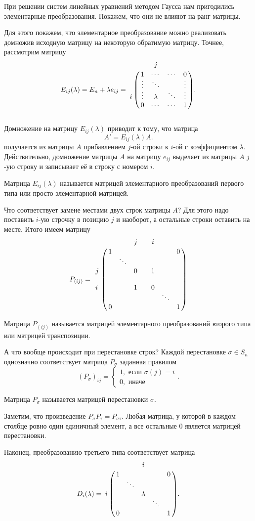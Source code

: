 При решении систем линейных уравнений методом Гаусса нам пригодились элементарные преобразования. Покажем, что они не влияют на ранг матрицы.

Для этого покажем, что элементарное преобразование можно реализовать домножив исходную матрицу на некоторую обратимую матрицу. Точнее, рассмотрим матрицу
$$ E_{ij}(\lambda)=E_n +\lambda e_{ij}=
\bordermatrix{
 & &j&& \cr
 &1&\cdots&\cdots&0\cr
 &\vdots&\ddots && \vdots\cr
i&\vdots& \lambda & \ddots& \vdots\cr
 &0&\cdots& \cdots&1
}.
$$\\
Домножение на матрицу $E_{ij}(\lambda)$ приводит к тому, что матрица
$$A'=E_{ij}(\lambda)A.$$
получается из матрицы $A$ прибавлением $j$-ой строки к $i$-ой с коэффициентом $\lambda$.
Действительно, домножение матрицы $A$ на матрицу $e_{ij}$ выделяет из матрицы $A$ $j$-ую строку и записывает её в строку с номером $i$.

\dfn Матрица $E_{ij}(\lambda)$ называется матрицей элементарного преобразований первого типа или просто элементарной матрицей.
\edfn

Что соответствует замене местами двух строк матрицы $A$? Для этого надо поставить $i$-ую строчку в позицию $j$ и наоборот, а остальные строки оставить на месте. Итого имеем матрицу
$$P_{(ij)}=\,\bordermatrix{
 & & &j& & i& \cr
 &1& & & & & &0\cr
 & &\ddots & & & & \cr
j\,& && 0 & & 1 & &\cr
\,& &&  & &  & &\cr
i\,& && 1 & &0 & &\cr
 & & & & & & \ddots& \cr
 &0& & & & & &1
}
$$


\dfn Матрица $P_{(ij)}$ называется матрицей элементарного преобразований второго типа или матрицей транспозиции.
\edfn

А что вообще происходит при перестановке строк? Каждой перестановке $\sigma \in S_n$ однозначно соответствует матрица $P_{\sigma}$ заданная правилом
$$(P_{\sigma})_{ij}= \begin{cases}
1, \text{ если $\sigma(j)=i$}\\
0, \text{ иначе }
\end{cases}.$$


\dfn Матрица $P_{\sigma}$ называется матрицей перестановки $\sigma$.
\edfn


\rm Заметим, что произведение $P_{\sigma} P_{\tau}=P_{\sigma\tau}$.  Любая матрица, у которой в каждом столбце ровно один единичный элемент, а все остальные 0 является матрицей перестановки.
\erm

Наконец, преобразованию третьего типа соответствует матрица
$$ D_{i}(\lambda)=
\bordermatrix{
 & &&i&& \cr
 &1&&&&0\cr
 &&\ddots &&& \cr
i&&  & \lambda && \cr
&&  &  &\ddots& \cr
 &0&& &&1
}.
$$

